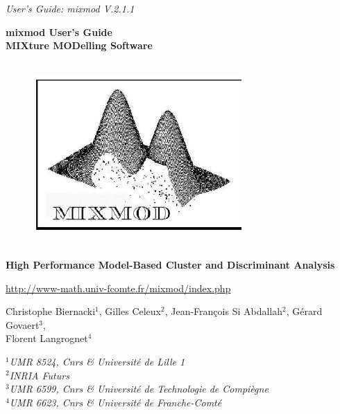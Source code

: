 \documentclass{book}
\begin{document}

\thispagestyle{empty}

{\vskip 3in }
\vspace{3cm}

{\hfill {\sl  User's Guide: {\sc mixmod} V.2.1.1}}\\

\vspace{3cm}

\begin{center}

{\vskip 0.1in }
{\Large\bf {\sc mixmod} User's Guide }\\
\vspace{1cm}
{\Large\bf {\bf MIX}ture {\bf MOD}elling Software}\\

\begin{figure}[h]
  \centering
  \includegraphics[width=8cm, height=7cm]{XEMlogo.eps}
\end{figure}

{\bf\large High Performance Model-Based Cluster and Discriminant Analysis}\\

\vspace{2cm}

\url{http://www-math.univ-fcomte.fr/mixmod/index.php}

\vspace{1cm}

\bigskip

\date{}


\medskip

Christophe Biernacki$^1$, Gilles Celeux$^2$, Jean-Fran\c cois Si Abdallah$^{2}$, G\'erard Govaert$^3$,\\
Florent Langrognet$^4$

\bigskip

{\it
$^1${UMR 8524, Cnrs \& Universit\'e de Lille 1}\\
$^2${INRIA Futurs}\\
$^3${UMR 6599, Cnrs \& Universit\'e de Technologie de Compi\`egne}\\
$^4${UMR 6623, Cnrs \& Universit\'e de Franche-Comt\'e}
}\\

\end{center}
\end{document}
